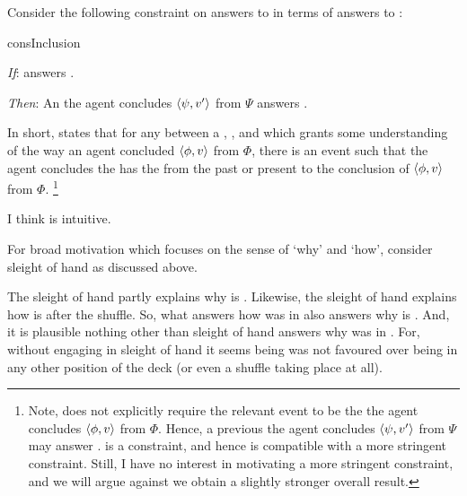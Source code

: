 \begin{note}
  Consider the following constraint on answers to \qWhy{} in terms of answers to \qHow{}:

  \begin{constraint}{consInclusion}{\issueInclusion{}}
    \mbox{ }
    \vspace{-\baselineskip}
    \begin{itenum}
    \item[\emph{If}:]
       answers \qWhy{}.
    \item[\emph{Then}:]
      An  the agent concludes \(\langle\psi, v'\rangle\) from \(\Psi\) answers \qHow{}.
    \end{itenum}
    \vspace{-\baselineskip}
  \end{constraint}

  \noindent%
  In short, \issueInclusion{} states that for any \fingfr{} between a , , and \pool{} which grants some understanding of the way an agent concluded \(\langle\phi, v\rangle\) from \(\Phi\), there is an event such that the agent concludes the \prop{} has the \val{} from the \pool{} past or present to the \agents{} conclusion of \(\langle\phi, v\rangle\) from \(\Phi\).%
  \footnote{
    Note, \qHow{} does not explicitly require the relevant event to be the  the agent concludes \(\langle\phi, v\rangle\) from \(\Phi\).
    Hence, a previous  the agent concludes \(\langle\psi, v'\rangle\) from \(\Psi\) may answer \qHow{}.
    \issueInclusion{} is a constraint, and hence is compatible with a more stringent constraint.
    Still, I have no interest in motivating a more stringent constraint, and we will argue against \issueInclusion{} we obtain a slightly stronger overall result.
  }
\end{note}


\begin{note}
  I think \issueInclusion{} is intuitive.
\end{note}


\begin{note}
  For broad motivation which focuses on the sense of `why' and `how', consider sleight of hand as discussed above.

  The sleight of hand partly explains why \mainCard{} is \mainCardPos{}.
  Likewise, the sleight of hand explains how \mainCard{} is \mainCardPos{} after the shuffle.
  So, what answers how \mainCard{} was in \mainCardPos{} also answers why \mainCard{} is \mainCardPos{}.
  And, it is plausible nothing other than sleight of hand answers why \mainCard{} was in \mainCardPos{}.
  For, without engaging in sleight of hand it seems \mainCard{} being \mainCardPos{} was not favoured over \mainCard{} being in any other position of the deck (or even a shuffle taking place at all).
\end{note}


